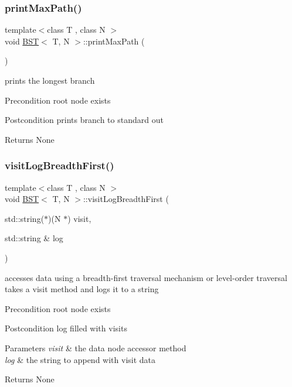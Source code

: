 \subsubsection{\texorpdfstring{print\+Max\+Path()}{printMaxPath()}}
{\footnotesize\ttfamily template$<$class T , class N $>$ \\
void \hyperlink{class_b_s_t}{B\+ST}$<$ T, N $>$\+::print\+Max\+Path (\begin{DoxyParamCaption}{ }\end{DoxyParamCaption})}

prints the longest branch \begin{DoxyPrecond}{Precondition}
root node exists 
\end{DoxyPrecond}
\begin{DoxyPostcond}{Postcondition}
prints branch to standard out 
\end{DoxyPostcond}
\begin{DoxyReturn}{Returns}
None 
\end{DoxyReturn}
\mbox{\label{class_b_s_t_a3e958de8a85c1268b11006a3ed32a7bb}} 
\subsubsection{\texorpdfstring{visit\+Log\+Breadth\+First()}{visitLogBreadthFirst()}}
{\footnotesize\ttfamily template$<$class T , class N $>$ \\
void \hyperlink{class_b_s_t}{B\+ST}$<$ T, N $>$\+::visit\+Log\+Breadth\+First (\begin{DoxyParamCaption}\item[{std\+::string($\ast$)(N $\ast$)}]{visit,  }\item[{std\+::string \&}]{log }\end{DoxyParamCaption})}

accesses data using a breadth-\/first traversal mechanism or level-\/order traversal takes a visit method and logs it to a string \begin{DoxyPrecond}{Precondition}
root node exists 
\end{DoxyPrecond}
\begin{DoxyPostcond}{Postcondition}
log filled with visits 
\end{DoxyPostcond}

\begin{DoxyParams}{Parameters}
{\em visit} & the data node accessor method \\
\hline
{\em log} & the string to append with visit data \\
\hline
\end{DoxyParams}
\begin{DoxyReturn}{Returns}
None 
\end{DoxyReturn}
\mbox{\label{class_b_s_t_a04d669d91c9528c61f618d022999ea26}} 
